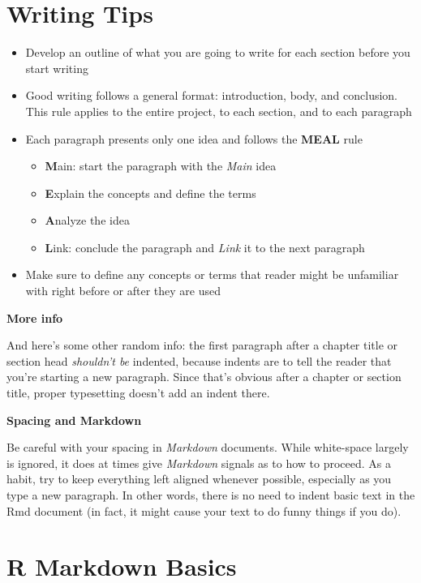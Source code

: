 \documentclass[12pt,oneside]{chicagocapstone}
\providecommand{\tightlist}{%
  \setlength{\itemsep}{0pt}\setlength{\parskip}{0pt}}
\begin{document}
\hypertarget{writing-tips}{%
\section*{Writing Tips}\label{writing-tips}}
\begin{itemize}
\tightlist
\item
  Develop an outline of what you are going to write for each section before you start writing
\item
  Good writing follows a general format: introduction, body, and conclusion. This rule applies to the entire project, to each section, and to each paragraph
\item
  Each paragraph presents only one idea and follows the \textbf{MEAL} rule
  \begin{itemize}
  \tightlist
  \item
    \textbf{M}ain: start the paragraph with the \emph{Main} idea
  \item
    \textbf{E}xplain the concepts and define the terms
  \item
    \textbf{A}nalyze the idea
  \item
    \textbf{L}ink: conclude the paragraph and \emph{Link} it to the next paragraph
  \end{itemize}
\item
  Make sure to define any concepts or terms that reader might be unfamiliar with right before or after they are used
\end{itemize}
\textbf{More info}

And here's some other random info: the first paragraph after a chapter title or section head \emph{shouldn't be} indented, because indents are to tell the reader that you're starting a new paragraph. Since that's obvious after a chapter or section title, proper typesetting doesn't add an indent there.

\textbf{Spacing and Markdown}

Be careful with your spacing in \emph{Markdown} documents. While white-space largely is ignored, it does at times give \emph{Markdown} signals as to how to proceed. As a habit, try to keep everything left aligned whenever possible, especially as you type a new paragraph. In other words, there is no need to indent basic text in the Rmd document (in fact, it might cause your text to do funny things if you do).

\hypertarget{rmd-basics}{%
\section*{R Markdown Basics}\label{rmd-basics}}
\end{document}
